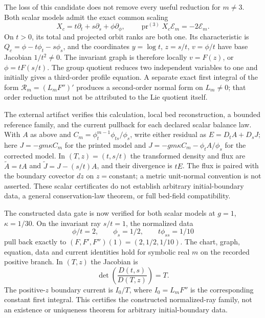 \documentclass[11pt]{article}
\theoremstyle{definition}
\newcommand{\E}{\mathcal E}
\newcommand{\pr}{\operatorname{pr}}
\begin{document}
The loss of this candidate does not remove every useful reduction for
$m\ne3$. Both
scalar models admit the exact common scaling
\begin{equation}
 X_c=t\partial_t+s\partial_s+\phi\partial_\phi,
 \qquad \pr^{(3)}X_c\E_m=-2\E_m.
 \label{eq:common-scaling}
\end{equation}
On $t>0$, its total and projected orbit ranks are both one. Its characteristic
is $Q_c=\phi-t\phi_t-s\phi_s$, and the coordinates
$y=\log t$, $z=s/t$, $v=\phi/t$ have base Jacobian $1/t^2\ne0$.
The invariant graph is therefore locally $v=F(z)$, or
$\phi=tF(s/t)$. The group quotient reduces two independent variables to one
and initially gives a third-order profile equation. A separate exact first
integral of the form $\mathcal R_m=(L_mF'')'$ produces a second-order normal
form on $L_m\ne0$; that order reduction must not be attributed to the Lie
quotient itself.

The external artifact verifies this calculation, local bed reconstruction,
a bounded reference family, and the current pullback for each declared scalar
balance law. With $A$ as above and
$C_m=\phi_t^{m-1}\phi_{ts}/\phi_s$, write either residual as
$E=D_tA+D_sJ$; here
$J=-gm\kappa C_m$ for the printed model and
$J=-gm\kappa C_m-\phi_tA/\phi_s$ for the corrected model.
In $(T,z)=(t,s/t)$ the transformed density and flux are
$\widetilde A=tA$ and $\widetilde J=J-(s/t)A$, and their divergence is
$tE$. The flux is paired with the boundary covector $dz$ on
$z=\mathrm{constant}$; a metric unit-normal convention is not asserted.
These scalar certificates do not establish arbitrary initial-boundary data,
a general conservation-law theorem, or full bed-field compatibility.

The constructed data gate is now verified for both scalar models at
$g=1$, $\kappa=1/30$. On the invariant ray $s/t=1$, the normalized data
\[
 \phi/t=2,\qquad \phi_s=1/2,\qquad t\phi_{ss}=1/10
\]
pull back exactly to $(F,F',F'')(1)=(2,1/2,1/10)$.
The chart, graph, equation, data and current identities hold for symbolic
real $m$ on the recorded positive branch. In $(T,z)$ the Jacobian is
\[
 \det\!\left(\frac{D(t,s)}{D(T,z)}\right)=T.
\]
The positive-$z$ boundary current is
$I_0/T$, where $I_0=L_mF''$ is the corresponding constant first integral.
This certifies the constructed normalized-ray family, not an existence or
uniqueness theorem for arbitrary initial-boundary data.


\clearpage
\end{document}

